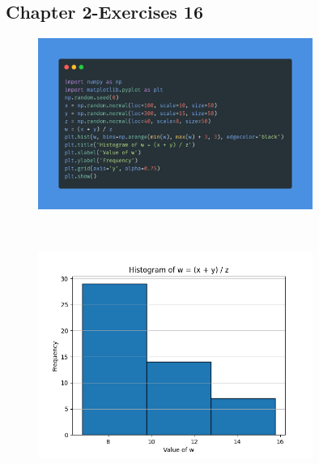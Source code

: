 \documentclass[a4paper,12pt]{article}
\begin{document}
\subsection{Chapter 2-Exercises 16}
\begin{figure}[h!]
    \centering
    \includegraphics[width=0.8\textwidth]{./Screenshots/Exercise1.6.py.png} 
\end{figure} \\
\begin{figure}[h!]
    \centering
    \includegraphics[width=0.8\textwidth]{./Screenshots/Exercise1.6.png} 
\end{figure} \\
\newpage
\end{document}
